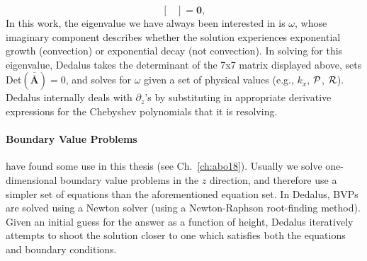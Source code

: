 \begin{enumerate}
\begin{equation}
\begin{bmatrix}
\end{bmatrix}
= \bm{0},
\end{equation}
In this work, the eigenvalue we have always been interested in is $\omega$, whose imaginary component describes whether the solution experiences exponential growth (convection) or exponential decay (not convection).
In solving for this eigenvalue, Dedalus takes the determinant of the 7x7 matrix displayed above, sets Det$(\bm{\overline{\overline{A}}}) = 0$, and solves for $\omega$ given a set of physical values (e.g., $k_x$, $\mathcal{P}$, $\mathcal{R}$).
Dedalus internally deals with $\partial_z$'s by substituting in appropriate derivative expressions for the Chebyshev polynomials that it is resolving.
\end{enumerate}

\paragraph{Boundary Value Problems} have found some use in this thesis (see Ch.~\ref{ch:abo18}).
Usually we solve one-dimensional boundary value problems in the $z$ direction, and therefore use a simpler set of equations than the aforementioned equation set.
In Dedalus, BVPs are solved using a Newton solver (using a Newton-Raphson root-finding method).
Given an initial guess for the answer as a function of height, Dedalus iteratively attempts to shoot the solution closer to one which satisfies both the equations and boundary conditions.






